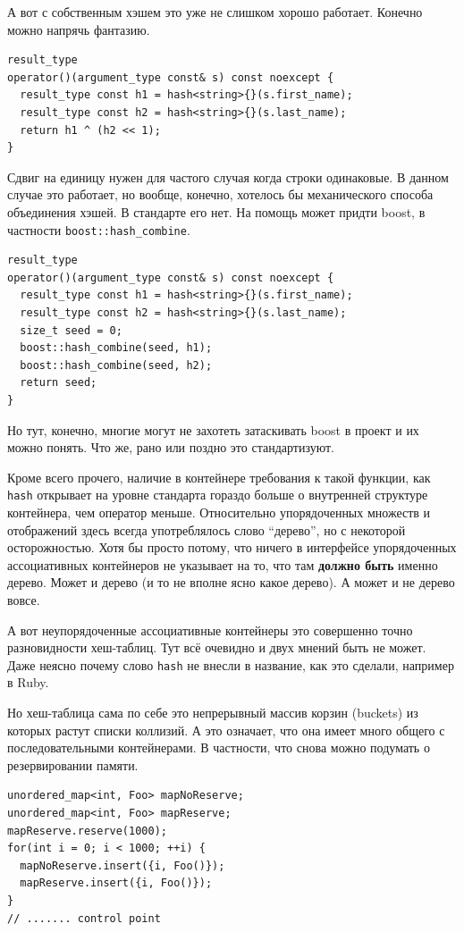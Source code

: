 \documentclass[a4paper,12pt,oneside]{book}
\begin{document}
А вот с собственным хэшем это уже не слишком хорошо работает. Конечно можно напрячь фантазию.

\begin{lstlisting}
result_type 
operator()(argument_type const& s) const noexcept {
  result_type const h1 = hash<string>{}(s.first_name);
  result_type const h2 = hash<string>{}(s.last_name);
  return h1 ^ (h2 << 1);
}
\end{lstlisting}

Сдвиг на единицу нужен для частого случая когда строки одинаковые. В данном случае это работает, но вообще, конечно, хотелось бы механического способа объединения хэшей. В стандарте его нет. На помощь может придти boost, в частности \lstinline!boost::hash_combine!.

\begin{lstlisting}
result_type 
operator()(argument_type const& s) const noexcept {
  result_type const h1 = hash<string>{}(s.first_name);
  result_type const h2 = hash<string>{}(s.last_name);
  size_t seed = 0;
  boost::hash_combine(seed, h1);
  boost::hash_combine(seed, h2);
  return seed;
}
\end{lstlisting}

Но тут, конечно, многие могут не захотеть затаскивать boost в проект и их можно понять. Что же, рано или поздно это стандартизуют.

Кроме всего прочего, наличие в контейнере требования к такой функции, как \lstinline!hash! открывает на уровне стандарта гораздо больше о внутренней структуре контейнера, чем оператор меньше. Относительно упорядоченных множеств и отображений здесь всегда употреблялось слово ``дерево'', но с некоторой осторожностью. Хотя бы просто потому, что ничего в интерфейсе упорядоченных ассоциативных контейнеров не указывает на то, что там \textbf{должно быть} именно дерево. Может и дерево (и то не вполне ясно какое дерево). А может и не дерево вовсе.

А вот неупорядоченные ассоциативные контейнеры это совершенно точно разновидности хеш-таблиц. Тут всё очевидно и двух мнений быть не может. Даже неясно почему слово \lstinline!hash! не внесли в название, как это сделали, например в Ruby.

Но хеш-таблица сама по себе это непрерывный массив корзин (buckets) из которых растут списки коллизий. А это означает, что она имеет много общего с последовательными контейнерами. В частности, что снова можно подумать о резервировании памяти.

\begin{lstlisting}
unordered_map<int, Foo> mapNoReserve;
unordered_map<int, Foo> mapReserve;
mapReserve.reserve(1000);
for(int i = 0; i < 1000; ++i) {
  mapNoReserve.insert({i, Foo()});
  mapReserve.insert({i, Foo()});
}
// ....... control point
\end{lstlisting}
\end{document}

